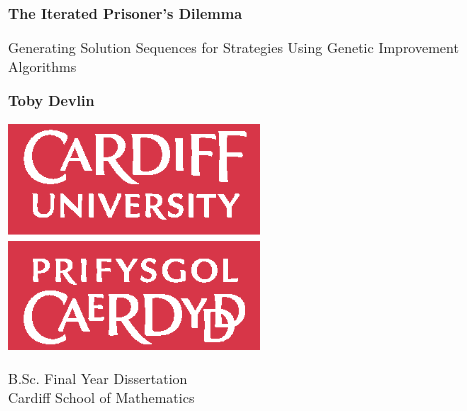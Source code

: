 \begin{titlepage}
    \begin{center}
        \vspace*{2cm}

        \textbf{The Iterated Prisoner's Dilemma}

        \vspace{0.5cm}
        Generating Solution Sequences for Strategies Using Genetic Improvement Algorithms

        \vspace{1.5cm}

        \textbf{Toby Devlin}
        \vspace{1.5cm}

        \includegraphics[width=0.5\textwidth]{img/universitylogo.eps}

        \vfill


        B.Sc. Final Year Dissertation\\

        \vspace{0.5cm}
        Cardiff School of Mathematics

        \vspace{1.5cm}



    \end{center}
\end{titlepage}